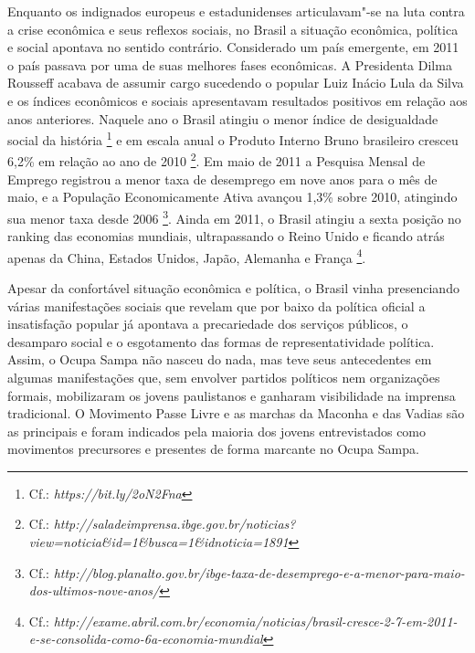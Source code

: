 Enquanto os indignados europeus e estadunidenses articulavam"-se na luta
contra a crise econômica e seus reflexos sociais, no Brasil a situação
econômica, política e social apontava no sentido contrário. Considerado
um país emergente, em 2011 o país passava por uma de suas melhores fases
econômicas. A Presidenta Dilma Rousseff acabava de assumir cargo
sucedendo o popular Luiz Inácio Lula da Silva e os índices econômicos e
sociais apresentavam resultados positivos em relação aos anos
anteriores. Naquele ano o Brasil atingiu o menor índice de desigualdade
social da história \footnote{Cf.:
  \emph{https://bit.ly/2oN2Fna}}
e em escala anual o Produto Interno Bruno brasileiro cresceu 6,2\% em
relação ao ano de 2010 \footnote{Cf.:
  \emph{http://saladeimprensa.ibge.gov.br/noticias?view=noticia\&id=1\&busca=1\&idnoticia=1891}}.%
Em maio de 2011 a Pesquisa Mensal de Emprego registrou a menor taxa de
desemprego em nove anos para o mês de maio, e a População Economicamente
Ativa avançou 1,3\% sobre 2010, atingindo sua menor taxa desde 2006
\footnote{Cf.:
  \emph{http://blog.planalto.gov.br/ibge-taxa-de-desemprego-e-a-menor-para-maio-dos-ultimos-nove-anos/}}.
Ainda em 2011, o Brasil atingiu a sexta posição no ranking das economias
mundiais, ultrapassando o Reino Unido e ficando atrás apenas da China,
Estados Unidos, Japão, Alemanha e França \footnote{Cf.:
  \emph{http://exame.abril.com.br/economia/noticias/brasil-cresce-2-7-em-2011-e-se-consolida-como-6a-economia-mundial}}.

Apesar da confortável situação econômica e política, o Brasil vinha
presenciando várias manifestações sociais que revelam que por baixo da
política oficial a insatisfação popular já apontava a precariedade dos
serviços públicos, o desamparo social e o esgotamento das formas de
representatividade política. Assim, o Ocupa Sampa não nasceu do nada,
mas teve seus antecedentes em algumas manifestações que, sem envolver
partidos políticos nem organizações formais, mobilizaram os jovens
paulistanos e ganharam visibilidade na imprensa tradicional. O Movimento
Passe Livre e as marchas da Maconha e das Vadias são as principais e
foram indicados pela maioria dos jovens entrevistados como movimentos
precursores e presentes de forma marcante no Ocupa Sampa.

